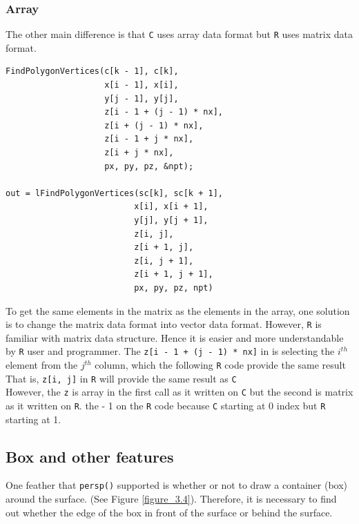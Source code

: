 \documentclass[11pt]{report}
\begin{document}
\subsubsection{Array}
The other main difference is that \texttt{C} uses array data format but \texttt{R} uses matrix data format. 
\begin{lstlisting}
FindPolygonVertices(c[k - 1], c[k],
                    x[i - 1], x[i],
                    y[j - 1], y[j],
                    z[i - 1 + (j - 1) * nx],
                    z[i + (j - 1) * nx],
                    z[i - 1 + j * nx],
                    z[i + j * nx],
                    px, py, pz, &npt);

out = lFindPolygonVertices(sc[k], sc[k + 1],
                          x[i], x[i + 1],
                          y[j], y[j + 1],
                          z[i, j],
                          z[i + 1, j],
                          z[i, j + 1],
                          z[i + 1, j + 1],
                          px, py, pz, npt)
\end{lstlisting}



To get the same elements in the matrix as the elements in the array, one solution is to change the matrix data format into vector data format. However, \texttt{R} is familiar with matrix data structure. Hence it is easier and more understandable by \texttt{R} user and programmer. The \texttt{z[i - 1 + (j - 1) * nx]} in  is selecting the $i^{th}$ element from the $j^{th}$ column, which the following \texttt{R} code provide the same result That is, \texttt{z[i, j]} in \texttt{R} will provide the same result as \texttt{C} \\

However, the \texttt{z} is array in the first call as it written on \texttt{C} but the second is matrix as it written on \texttt{R}. the - 1 on the \texttt{R} code because \texttt{C} starting at 0 index but \texttt{R} starting at 1.\\

\subsection{Box and other features}
One feather that \texttt{persp()} supported is whether or not to draw a container (box) around the surface. (See Figure \ref{figure_3.4}). Therefore, it is necessary to find out whether the edge of the box in front of the surface or behind the surface. \\ 
\end{document}
